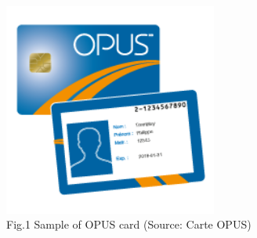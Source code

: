 \documentclass[a4paper, 11pt]{report}
\begin{document}
\qquad\qquad\qquad\qquad \includegraphics[width=70mm,scale=0.5]
{opus.png}\\
\tab\tab\qquad\qquad Fig.1 Sample of OPUS card (Source: Carte OPUS)
\end{document}
